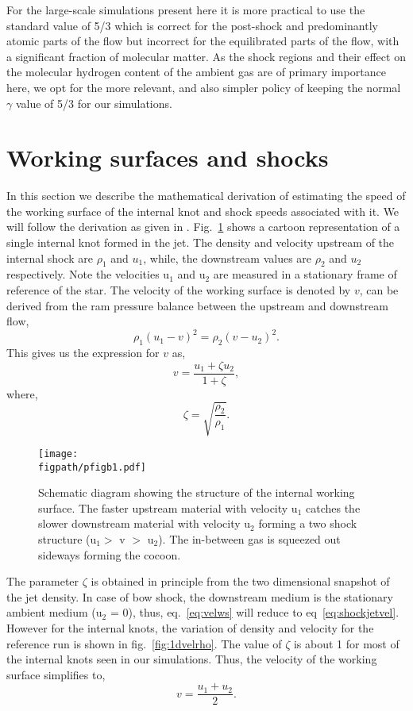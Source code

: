 \documentclass[useAMS,usenatbib]{mn2e}
\newcommand{\figpath}{../NEWFIGS}
\begin{document}
For the large-scale simulations present here it is more practical to use
the standard value of 5/3 which is correct for the post-shock 
and predominantly atomic parts of the flow but incorrect for the
equilibrated parts of the flow, with a significant fraction of molecular matter.
As the shock regions and their effect on the molecular hydrogen content of 
the ambient gas are of primary importance here, we opt for the more
relevant, and also simpler policy of keeping the normal $\gamma$
value of 5/3 for our simulations. 

\section{Working surfaces and shocks}
\label{sec:worksurface}
In this section we describe the mathematical derivation of estimating
the speed of the working surface of the internal knot and shock speeds
associated with it. We will follow the derivation as given in
\citep{Raga:1990p16416,Raga:1992p16392}. Fig.~\ref{fig:interknot} shows a cartoon
representation of a single internal knot formed in the jet. 
The density and velocity upstream of the internal shock are
$\rho_{1}$ and $u_{1}$, while, the downstream values are $\rho_{2}$
and $u_{2}$ respectively. Note the velocities u$_1$ and u$_2$ are measured
in a stationary frame of reference of the star. The velocity of the working surface is
denoted by $v$, can be derived from the ram pressure balance between the upstream and
downstream flow,
\begin{equation}
\rho_1 (u_1 - v)^{2} = \rho_2 (v - u_2)^{2}.
\label{eq:ramPbal}
\end{equation}
This gives us the expression for $v$ as, 
\begin{equation}
v = \frac{u_1 + \zeta u_2}{1 + \zeta},
\label{eq:velws}
\end{equation} 
where, $$\zeta = \sqrt{\frac{\rho_{2}}{\rho_1}}.$$

\begin{figure}
\texttt{[image: \\figpath/pfigb1.pdf]}%
\caption{Schematic diagram showing the structure of the internal
  working surface. The faster upstream material with velocity u$_1$
  catches the slower downstream material with velocity u$_2$ forming a
two shock structure (u$_1 >$ v $>$ u$_2$). The in-between gas is squeezed out sideways
forming the cocoon.}
\label{fig:interknot}
\end{figure}

The parameter $\zeta$ is obtained in principle from the two
dimensional snapshot of the jet density. In case of bow shock, the
downstream medium is the stationary ambient medium (u$_2$ = 0), thus,
eq.~\ref{eq:velws} will reduce to eq~\ref{eq:shockjetvel}.
However for the internal knots, the variation of density and
velocity for the reference run is shown in fig.~\ref{fig:1dvelrho}.
The value of $\zeta$ is about 1 for most of the
internal knots seen in our simulations. Thus, the velocity of the
working surface simplifies to, 
\begin{equation}
v = \frac{u_1 + u_2}{2}.
\label{eq:velwssimple}
\end{equation}
\end{document}
